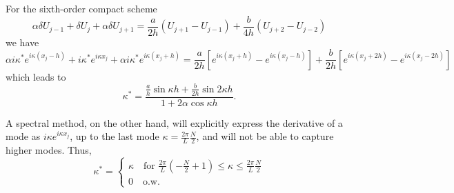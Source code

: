 \documentclass[oneside,a4paper,11pt]{report}
\begin{document}
For the sixth-order compact scheme
\begin{equation}
    \alpha \delta U_{j-1} + \delta U_j + \alpha \delta U_{j+1} = \frac{a}{2h} \left( U_{j+1} - U_{j-1} \right) + \frac{b}{4h} \left ( U_{j+2} - U_{j-2} \right)
\end{equation}
we have
\begin{equation}
    \alpha i \kappa^* e^{i \kappa (x_j -h) } + i\kappa^* e^{i \kappa x_j} + \alpha i \kappa^* e^{i \kappa (x_j + h)} = \frac{a}{2h} \left [ e^{i \kappa (x_j+h) } - e^{ i \kappa (x_j-h) } \right ] + \frac{b}{2h} \left [ e^{i \kappa (x_j+2h) } - e^{ i \kappa (x_j-2h) } \right ]
\end{equation}
which leads to
\begin{equation}
    \kappa^* = \frac{ \frac{a}{h} \sin \kappa h + \frac{b}{2h} \sin 2\kappa h}{1 + 2\alpha \cos \kappa h}.
\end{equation}

A spectral method, on the other hand, will explicitly express the derivative of a mode as $i \kappa e^{i \kappa x_j}$, up to the last mode $\kappa = \frac{2 \pi}{L} \frac{N}{2}$, and will not be able to capture higher modes. Thus,
\begin{equation}
    \kappa^* = \begin{cases} \kappa \quad \text{for } \frac{2 \pi}{L} \left (-\frac{N}{2} +1 \right ) \le \kappa \le \frac{2 \pi}{L} \frac{N}{2} \\ 0 \quad \text{o.w.} \end{cases}
\end{equation}

\end{document}
